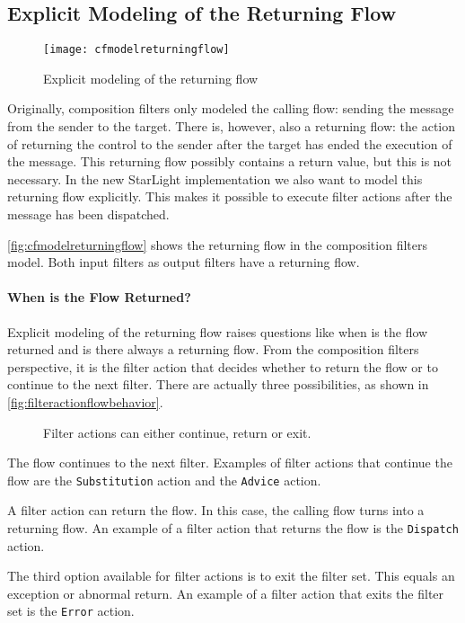 \subsection{Explicit Modeling of the Returning Flow}
\begin{figure}[htbp]
  \centering
  \texttt{[image: cfmodelreturningflow]}
  \caption{Explicit modeling of the returning flow}
  \label{fig:cfmodelreturningflow}
\end{figure}

Originally, composition filters only modeled the calling flow: sending the message from the sender to the target. There is, however, also a returning flow: the action of returning the control to the sender after the target has ended the execution of the message. This returning flow possibly contains a return value, but this is not necessary. In the new StarLight implementation we also want to model this returning flow explicitly. This makes it possible to execute filter actions after the message has been dispatched.

\autoref{fig:cfmodelreturningflow} shows the returning flow in the composition filters model. Both input filters as output filters have a returning flow.

\paragraph{When is the Flow Returned?}
Explicit modeling of the returning flow raises questions like when is the flow returned and is there always a returning flow. From the composition filters perspective, it is the filter action that decides whether to return the flow or to continue to the next filter. There are actually three possibilities, as shown in \autoref{fig:filteractionflowbehavior}.

\begin{figure}[htbp]
  \centering
  \qquad
  \qquad
  \caption[Filter actions can either continue, return or exit]{Filter actions can either continue, return or exit.}
  \label{fig:filteractionflowbehavior}
\end{figure}

\begin{description}[style=nextline, noitemsep]
\item[Continue]
The flow continues to the next filter. Examples of filter actions that continue the flow are the \lstinline|Substitution| action and the \lstinline|Advice| action.
\item[Return]
A filter action can return the flow. In this case, the calling flow turns into a returning flow. An example of a filter action that returns the flow is the \lstinline|Dispatch| action.
\item[Exit]
The third option available for filter actions is to exit the filter set. This equals an exception or abnormal return. An example of a filter action that exits the filter set is the \lstinline|Error| action.
\end{description}

